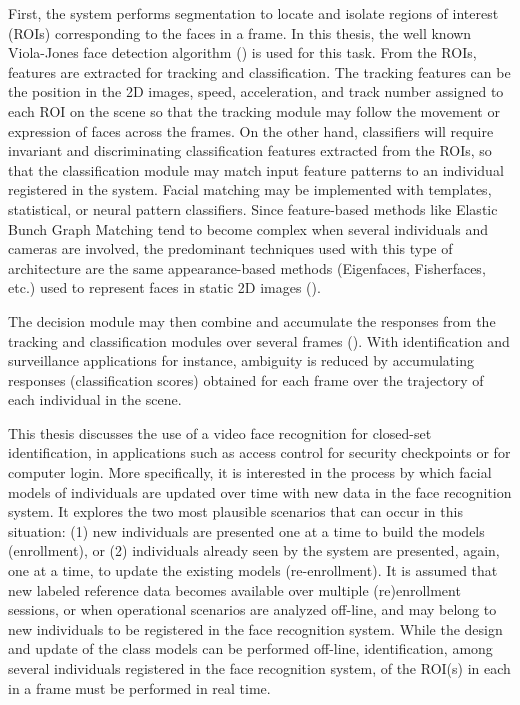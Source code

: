 First, the system performs segmentation to locate and isolate regions of interest (ROIs) corresponding to the faces in a frame.
In this thesis, the well known Viola-Jones face detection algorithm (\cite{viola01}) is used for this task.
From the ROIs, features are extracted for tracking and classification.
The tracking features can be the position in the 2D images, speed, acceleration, and track number assigned to each ROI on the scene so that the tracking module may follow the movement or expression of faces across the frames.
On the other hand, classifiers will require invariant and discriminating classification features extracted from the ROIs, so that the classification module may match input feature patterns to an individual registered in the system.
Facial matching may be implemented with templates, statistical, or neural pattern classifiers.
Since feature-based methods like Elastic Bunch Graph Matching tend to become complex when several individuals and cameras are involved, the predominant techniques used with this type of architecture are the same appearance-based methods (Eigenfaces, Fisherfaces, etc.) used to represent faces in static 2D images (\cite{zhang09, zhao03}).

The decision module may then combine and accumulate the responses from the tracking and classification modules over several frames (\cite{granger01}).
With identification and surveillance applications for instance, ambiguity is reduced by accumulating responses (classification scores) obtained for each frame over the trajectory of each individual in the scene.

This thesis discusses the use of a video face recognition for closed-set identification, in applications such as access control for security checkpoints or for computer login.
More specifically, it is interested in the process by which facial models of individuals are updated over time with new data in the face recognition system. 
It explores the two most plausible scenarios that can occur in this situation: (1) new individuals are presented one at a time to build the models (enrollment), or (2) individuals already seen by the system are presented, again, one at a time, to update the existing models (re-enrollment).  
It is assumed that new labeled reference data becomes available over multiple (re)enrollment sessions, or when operational scenarios are analyzed off-line, and may belong to new individuals to be registered in the face recognition system.
While the design and update of the class models can be performed off-line, identification, among several individuals registered in the face recognition system, of the ROI(s) in each in a frame must be performed in real time.


